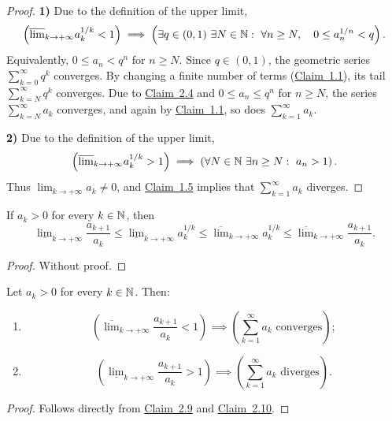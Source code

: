 \begin{proof}
\textbf{1)} Due to the definition of the upper limit,
\[
\left(\overline{\lim}_{k\to+\infty}a_k^{1/k}<1\right)
\implies
\left(\exists q\in(0,1)\ \exists N\in\mathbb{N}:\ \forall n\ge N,
\quad 0\le a_n^{1/n}<q\right).
\]
Equivalently, $0\le a_n<q^n$ for $n\ge N$. Since $q\in(0,1)$, the geometric series $\sum_{k=0}^{\infty}q^k$ converges. By changing a finite number of terms (\hyperref[claim:1.1]{Claim~1.1}), its tail $\sum_{k=N}^{\infty}q^k$ converges. Due to \hyperref[claim:2.4]{Claim~2.4} and $0\le a_n\le q^n$ for $n\ge N$, the series $\sum_{k=N}^{\infty}a_k$ converges, and again by \hyperref[claim:1.1]{Claim~1.1}, so does $\sum_{k=1}^{\infty}a_k$.

\medskip
\noindent\textbf{2)} Due to the definition of the upper limit,
\[
\left(\overline{\lim}_{k\to+\infty}a_k^{1/k}>1\right)
\implies
\left(\forall N\in\mathbb{N}\ \exists n\ge N:\ a_n>1\right).
\]
Thus $\lim_{k\to+\infty}a_k\ne0$, and \hyperref[claim:1.5]{Claim~1.5} implies that $\sum_{k=1}^{\infty}a_k$ diverges.
\end{proof}

\begin{claim}\label{claim:2.10}
If $a_k>0$ for every $k\in\mathbb{N}$, then
\[
\underline{\lim}_{k\to+\infty}\frac{a_{k+1}}{a_k}
\le
\underline{\lim}_{k\to+\infty}a_k^{1/k}
\le
\overline{\lim}_{k\to+\infty}a_k^{1/k}
\le
\overline{\lim}_{k\to+\infty}\frac{a_{k+1}}{a_k}.
\]
\end{claim}

\begin{proof}
Without proof.
\end{proof}

\begin{claim}\label{claim:2.11}
Let $a_k>0$ for every $k\in\mathbb{N}$. Then:
\begin{enumerate}[label=\arabic*)]
\item\label{item:claim:2.11:1}
\[
\left(\overline{\lim}_{k\to+\infty}\frac{a_{k+1}}{a_k}<1\right)
\implies
\left(\sum_{k=1}^{\infty}a_k\text{ converges}\right);
\]
\item\label{item:claim:2.11:2}
\[
\left(\underline{\lim}_{k\to+\infty}\frac{a_{k+1}}{a_k}>1\right)
\implies
\left(\sum_{k=1}^{\infty}a_k\text{ diverges}\right).
\]
\end{enumerate}
\end{claim}

\begin{proof}
Follows directly from \hyperref[claim:2.9]{Claim~2.9} and \hyperref[claim:2.10]{Claim~2.10}.
\end{proof}

